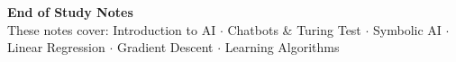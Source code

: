 \documentclass[12pt,a4paper]{report}
\begin{document}
\vfill
\begin{tcolorbox}[colback=accent!10, colframe=accent, boxrule=1.5pt, arc=6pt]
\centering
\textbf{\large End of Study Notes}\\[0.2cm]
\normalsize These notes cover: Introduction to AI $\cdot$ Chatbots \& Turing Test $\cdot$ Symbolic AI $\cdot$ Linear Regression $\cdot$ Gradient Descent $\cdot$ Learning Algorithms
\end{tcolorbox}
\end{document}
